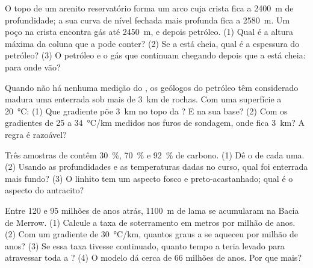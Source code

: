 \begin{exercise}[$\star\star$]\label{exo:g11:fossil-fuel-geology:9}
O topo de um arenito reservatório forma um arco cuja crista fica a
\qty{2400}{m} de profundidade; a sua curva de nível fechada mais profunda
fica a \qty{2580}{m}. Um poço na crista encontra gás até \qty{2450}{m}, e
depois petróleo. (1) Qual é a altura máxima da coluna que a  pode
conter? (2) Se a  está cheia, qual é a espessura do petróleo?
(3) O petróleo e o gás que continuam chegando depois que a  está
cheia: para onde vão?
\end{exercise}

\begin{exercise}[$\star\star$]\label{exo:g11:fossil-fuel-geology:10}
Quando não há nenhuma medição do , os geólogos do petróleo têm
considerado madura uma  enterrada sob mais de \qty{3}{km} de
rochas. Com uma superfície a \qty{20}{\degreeCelsius}: (1) Que gradiente põe
\qty{3}{km} no topo da ? E na sua base? (2) Com os
gradientes de 25 a \qty{34}{\degreeCelsius/km} medidos nos furos de
sondagem, onde fica \qty{3}{km}? A regra é razoável?
\end{exercise}

\begin{exercise}[$\star\star$]\label{exo:g11:fossil-fuel-geology:11}
Três amostras de  contêm \qty{30}{\percent}, \qty{70}{\percent} e
\qty{92}{\percent} de carbono. (1) Dê o  de cada uma.
(2) Usando as profundidades e as temperaturas dadas no curso, qual foi
enterrada mais fundo? (3) O linhito tem um aspecto fosco e
preto-acastanhado; qual é o aspecto do antracito?
\end{exercise}

\begin{exercise}[$\star\star\star$]\label{exo:g11:fossil-fuel-geology:12}
Entre 120 e 95 milhões de anos atrás, \qty{1100}{m} de lama se acumularam
na Bacia de Merrow. (1) Calcule a taxa de soterramento em metros por milhão
de anos. (2) Com um gradiente de \qty{30}{\degreeCelsius/km}, quantos graus
a  se aqueceu por milhão de anos? (3) Se essa taxa tivesse
continuado, quanto tempo a  teria levado para atravessar toda
a ? (4) O modelo dá cerca de 66 milhões de anos. Por que
mais?
\end{exercise}

